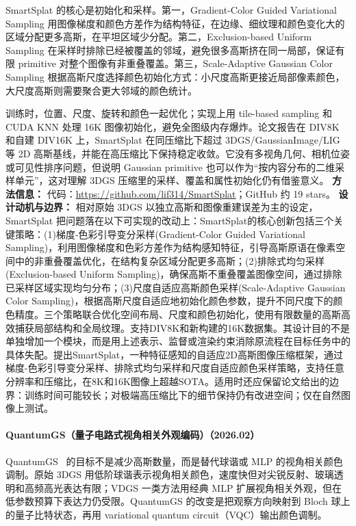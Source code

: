 SmartSplat 的核心是初始化和采样。第一，Gradient-Color Guided Variational Sampling 用图像梯度和颜色方差作为结构特征，在边缘、细纹理和颜色变化大的区域分配更多高斯，在平坦区域少分配。第二，Exclusion-based Uniform Sampling 在采样时排除已经被覆盖的邻域，避免很多高斯挤在同一局部，保证有限 primitive 对整个图像有非重叠覆盖。第三，Scale-Adaptive Gaussian Color Sampling 根据高斯尺度选择颜色初始化方式：小尺度高斯更接近局部像素颜色，大尺度高斯则需要聚合更大邻域的颜色统计。

训练时，位置、尺度、旋转和颜色一起优化；实现上用 tile-based sampling 和 CUDA KNN 处理 16K 图像初始化，避免全图级内存爆炸。论文报告在 DIV8K 和自建 DIV16K 上，SmartSplat 在同压缩比下超过 3DGS/GaussianImage/LIG 等 2D 高斯基线，并能在高压缩比下保持稳定收敛。它没有多视角几何、相机位姿或可见性排序问题，但说明 Gaussian primitive 也可以作为“按内容分布的二维采样单元”，这对理解 3DGS 压缩里的采样、覆盖和属性初始化仍有借鉴意义。
\textbf{方法信息：} 代码：\url{https://github.com/lif314/SmartSplat}；GitHub 约 19 stars。
\textbf{设计动机与边界：} 相对原始 3DGS 以独立高斯和图像重建误差为主的设定，SmartSplat 把问题落在以下可实现的改动上：SmartSplat的核心创新包括三个关键策略：(1)梯度-色彩引导变分采样(Gradient-Color Guided Variational Sampling)，利用图像梯度和色彩方差作为结构感知特征，引导高斯原语在像素空间中的非重叠覆盖优化，在结构复杂区域分配更多高斯；(2)排除式均匀采样(Exclusion-based Uniform Sampling)，确保高斯不重叠覆盖图像空间，通过排除已采样区域实现均匀分布；(3)尺度自适应高斯颜色采样(Scale-Adaptive Gaussian Color Sampling)，根据高斯尺度自适应地初始化颜色参数，提升不同尺度下的颜色精度。三个策略联合优化空间布局、尺度和颜色初始化，使用有限数量的高斯高效捕获局部结构和全局纹理。支持DIV8K和新构建的16K数据集。其设计目的不是单独增加一个模块，而是用上述表示、监督或渲染约束消除原流程在目标任务中的具体失配。提出SmartSplat，一种特征感知的自适应2D高斯图像压缩框架，通过梯度-色彩引导变分采样、排除式均匀采样和尺度自适应颜色采样策略，支持任意分辨率和压缩比，在8K和16K图像上超越SOTA。适用时还应保留论文给出的边界：训练时间可能较长；对极端高压缩比下的细节保持仍有改进空间；仅在自然图像上测试。
\paragraph{QuantumGS（量子电路式视角相关外观编码）（2026.02）}
QuantumGS~\cite{2602_05047} 的目标不是减少高斯数量，而是替代球谐或 MLP 的视角相关颜色调制。原始 3DGS 用低阶球谐表示视角相关颜色，速度快但对尖锐反射、玻璃透明和高频高光表达有限；VDGS 一类方法用经典 MLP 扩展视角相关外观，但在低参数预算下表达力仍受限。QuantumGS 的改变是把观察方向映射到 Bloch 球上的量子比特状态，再用 variational quantum circuit（VQC）输出颜色调制。


